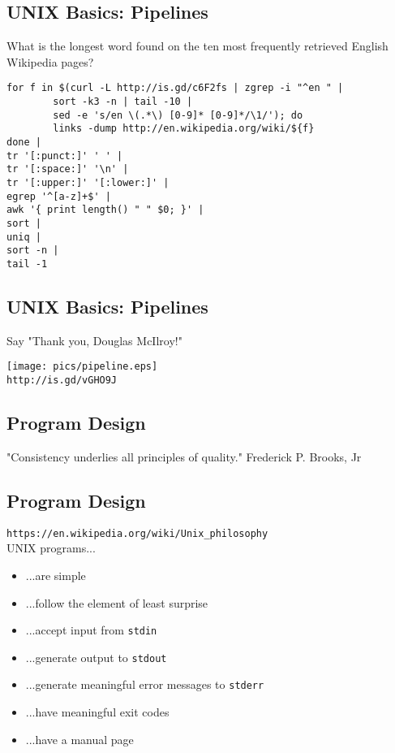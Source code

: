 \documentclass[sxga]{xdvislides}
\begin{document}
\subsection{UNIX Basics: Pipelines}
What is the longest word found on the ten most
frequently retrieved English Wikipedia pages?
\begin{verbatim}
for f in $(curl -L http://is.gd/c6F2fs | zgrep -i "^en " |
        sort -k3 -n | tail -10 |
        sed -e 's/en \(.*\) [0-9]* [0-9]*/\1/'); do
        links -dump http://en.wikipedia.org/wiki/${f}
done |
tr '[:punct:]' ' ' |
tr '[:space:]' '\n' |
tr '[:upper:]' '[:lower:]' |
egrep '^[a-z]+$' |
awk '{ print length() " " $0; }' |
sort |
uniq |
sort -n |
tail -1
\end{verbatim}

\subsection{UNIX Basics: Pipelines}
Say "Thank you, Douglas McIlroy!"
\begin{center}
\texttt{[image: pics/pipeline.eps]} \\
\verb+http://is.gd/vGHO9J+ \\
\end{center}



\subsection{Program Design}
\vspace*{\fill}
\Huge
\begin{center}
"Consistency underlies all principles of quality." Frederick P. Brooks, Jr
\end{center}
\Normalsize
\vspace*{\fill}


\subsection{Program Design}
\verb+https://en.wikipedia.org/wiki/Unix_philosophy+ \\

UNIX programs...
\begin{itemize}
	\item ...are simple
	\item ...follow the element of least surprise
	\item ...accept input from {\tt stdin}
	\item ...generate output to {\tt stdout}
	\item ...generate meaningful error messages to {\tt stderr}
	\item ...have meaningful exit codes
	\item ...have a manual page
\end{itemize}
\end{document}
